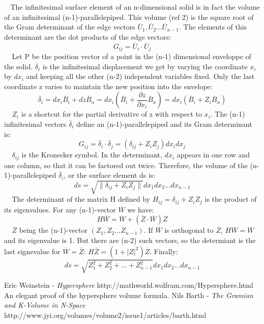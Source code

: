 \documentclass[12pt]{article}
\begin{document}
$~~~~$The infinitesimal surface element of an n-dimensional solid is in fact the volume of an infinitesimal (n-1)-parallelepiped. This volume (ref 2) is the square root of the Gram determinant of the edge vectors $\overline{U}_1, \overline{U}_2...\overline{U}_{n-1}$. The elements of this determinant are the dot products of the edge vectors:
$$G_{ij}=\overline{U}_i\cdotp\overline{U}_j$$
$~~~~~$Let P be the position vector of a point in the (n-1) dimensional enveloppe of the solid. $\overline{\delta}_i$ is the infinitesimal displacement we get by varying the coordinate $x_i$ by $dx_i$ and keeping all the other (n-2) independent variables fixed. Only the last coordinate z varies  to maintain the new position into the envelope:
$$\overline{\delta}_i=dx_i\overline{B}_i+dz\overline{B}_n
=dx_i(\overline{B}_i+ \frac{\partial{z}}{\partial{x_i}}\overline{B}_n)
=dx_i(\overline{B}_i+ Z_i\overline{B}_n)$$
$~~~~~$$Z_i$ is a  shortcut for the partial derivative of z with respect to $x_i$. The (n-1) infinitesimal vectors  $\overline{\delta}_i$ define an (n-1)-parallelepiped and its Gram determinant is:
$$G_{ij}=\overline{\delta}_i\cdotp\overline{\delta}_j
=(\delta_{ij}+Z_iZ_j)dx_idx_j$$
$~~~~~$$\delta_{ij}$ is the Kronecker symbol. In the determinant, $dx_i$ appears in one row and one column, so that it can be factored out twice. Therefore, the volume of the (n-1)-parallelepiped $\overline{\delta}_i$, or the surface element ds is:
$$ds=\sqrt{\|\delta_{ij}+Z_iZ_j\|}dx_1dx_2...dx_{n-1}$$
$~~~~~$The determinant of the matrix H defined by $H_{ij}=\delta_{ij}+Z_iZ_j$ is the product of its eigenvalues. For any (n-1)-vector $\overline{W}$ we have:
$$H\overline{W}=\overline{W}+(\overline{Z}\cdotp\overline{W})\overline{Z}$$
$~~~~~$$\overline{Z}$ being the (n-1)-vector $(Z_1, Z_2...Z_{n-1})$. If $\overline{W}$ is orthogonal to $\overline{Z}$, $H\overline{W}=\overline{W}$ and its eigenvalue is 1. But there are (n-2) such vectors, so the determiant is the last eignevalue for $\overline{W}=\overline{Z}$: $H\overline{Z}=(1+|Z|^2)\overline{Z}$. Finally:
$$ds=\sqrt{Z_1^2+Z_2^2+...+Z_{n-1}^2}dx_1dx_2...dx_{n-1}$$

\begin{thebibliography}{1}
 Eric Weinstein - {\it Hypersphere}\newline
http://mathworld.wolfram.com/Hypersphere.html\newline
An elegant proof of the hypersphere volume formula.
 Nils Barth - {\it The Gramian and K-Volume in N-Space}\newline 
http://www.jyi.org/volumes/volume2/issue1/articles/barth.html\newline
\end{thebibliography}

\end{document}
